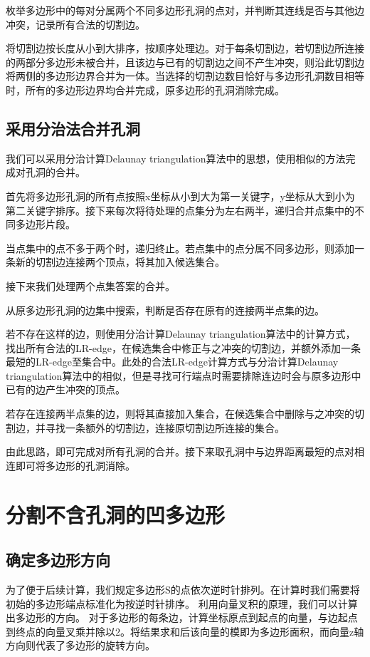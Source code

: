 枚举多边形中的每对分属两个不同多边形孔洞的点对，并判断其连线是否与其他边冲突，记录所有合法的切割边。

将切割边按长度从小到大排序，按顺序处理边。对于每条切割边，若切割边所连接的两部分多边形未被合并，且该边与已有的切割边之间不产生冲突，则沿此切割边将两侧的多边形边界合并为一体。当选择的切割边数目恰好与多边形孔洞数目相等时，所有的多边形边界均合并完成，原多边形的孔洞消除完成。

\subsection{采用分治法合并孔洞}
我们可以采用分治计算Delaunay triangulation算法中的思想，使用相似的方法完成对孔洞的合并。

首先将多边形孔洞的所有点按照x坐标从小到大为第一关键字，y坐标从大到小为第二关键字排序。接下来每次将待处理的点集分为左右两半，递归合并点集中的不同多边形片段。

当点集中的点不多于两个时，递归终止。若点集中的点分属不同多边形，则添加一条新的切割边连接两个顶点，将其加入候选集合。

接下来我们处理两个点集答案的合并。

从原多边形孔洞的边集中搜索，判断是否存在原有的连接两半点集的边。

若不存在这样的边，则使用分治计算Delaunay triangulation算法中的计算方式，找出所有合法的LR-edge，在候选集合中修正与之冲突的切割边，并额外添加一条最短的LR-edge至集合中。此处的合法LR-edge计算方式与分治计算Delaunay triangulation算法中的相似，但是寻找可行端点时需要排除连边时会与原多边形中已有的边产生冲突的顶点。

若存在连接两半点集的边，则将其直接加入集合，在候选集合中删除与之冲突的切割边，并寻找一条额外的切割边，连接原切割边所连接的集合。

由此思路，即可完成对所有孔洞的合并。接下来取孔洞中与边界距离最短的点对相连即可将多边形的孔洞消除。

\section{分割不含孔洞的凹多边形}


\subsection{确定多边形方向}
为了便于后续计算，我们规定多边形S的点依次逆时针排列。在计算时我们需要将初始的多边形端点标准化为按逆时针排序。
利用向量叉积的原理，我们可以计算出多边形的方向。
对于多边形的每条边，计算坐标原点到起点的向量，与边起点到终点的向量叉乘并除以2。将结果求和后该向量的模即为多边形面积，而向量z轴方向则代表了多边形的旋转方向。

